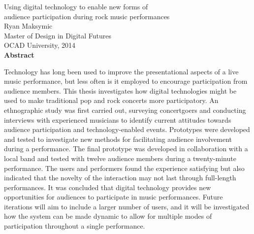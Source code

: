 \begin{center}
{Using digital technology to enable new forms of\\audience participation during rock music performances\\[0.25cm]
Ryan Maksymic\\[0.25cm]
Master of Design in Digital Futures\\[0.25cm]
OCAD University, 2014\\[0.75cm]
\large\textbf{Abstract}}\\
\end{center}

Technology has long been used to improve the presentational aspects of a live music performance, but less often is it employed to encourage participation from audience members. This thesis investigates how digital technologies might be used to make traditional pop and rock concerts more participatory. An ethnographic study was first carried out, surveying concertgoers and conducting interviews with experienced musicians to identify current attitudes towards audience participation and technology-enabled events. Prototypes were developed and tested to investigate new methods for facilitating audience involvement during a performance. The final prototype was developed in collaboration with a local band and tested with twelve audience members during a twenty-minute performance. The users and performers found the experience satisfying but also indicated that the novelty of the interaction may not last through full-length performances. It was concluded that digital technology provides new opportunities for audiences to participate in music performances. Future iterations will aim to include a larger number of users, and it will be investigated how the system can be made dynamic to allow for multiple modes of participation throughout a single performance.

